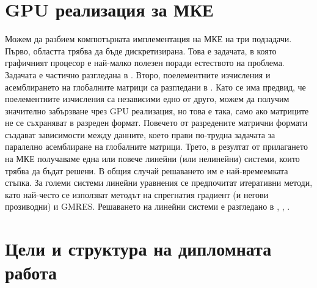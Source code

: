 \documentclass[12pt]{report}
\begin{document}
\section{GPU реализация за МКЕ}
Можем да разбием компютърната имплементация на МКЕ на три подзадачи. Първо, областта трябва да бъде дискретизирана. Това е задачата, в която графичният процесор е най-малко полезен поради естеството на проблема. Задачата е частично разгледана в \cite{meshing}. Второ, поелементните изчисления и асемблирането на глобалните матрици са разгледани в \cite{assembling}. Като се има предвид, че поелементните изчисления са независими едно от друго, можем да получим значително забързване чрез GPU реализация, но това е така, само ако матриците не се съхраняват в разреден формат. Повечето от разредените матрични формати създават зависимости между данните, което прави по-трудна задачата за паралелно асемблиране на глобалните матрици. Трето, в резултат от прилагането на МКЕ получаваме една или повече линейни (или нелинейни) системи, които трябва да бъдат решени. В общия случай решаването им е най-времеемката стъпка. За големи системи линейни уравнения се предпочитат итеративни методи, като най-често се използват методът на спрегнатия градиент (и негови прозиводни) и GMRES. Решаването на линейни системи е разгледано в \cite{sparse-solvers}, \cite{matrix-vector-mult}, \cite{biconjugate}.

\section{Цели и структура на дипломната работа}
\end{document}
